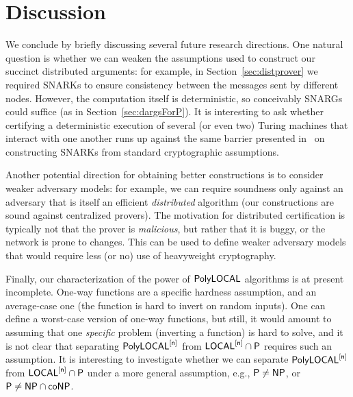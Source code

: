 \section{Discussion}
\label{sec:discuss}

We conclude by briefly discussing several future research directions.
One natural question is whether we can weaken the assumptions used to construct our
succinct distributed arguments: for example, in Section~\ref{sec:distprover}
we required SNARKs to ensure consistency between the messages sent by different nodes.
However, the computation itself is deterministic, so conceivably SNARGs could suffice
(as in Section~\ref{sec:dargsForP}).
It is interesting to ask whether certifying a deterministic execution of several (or even two)
Turing machines that interact with one another runs up against the same barrier presented in~\cite{gentry2011separating}
on constructing SNARKs from standard cryptographic assumptions.

Another potential direction for obtaining better constructions is to consider weaker adversary models:
for example, we can require soundness only against an adversary that is itself an efficient \emph{distributed}
algorithm (our constructions are sound against centralized provers).
The motivation for distributed certification is typically not that the prover is \emph{malicious},
but rather that it is buggy, or the network is prone to changes.
This can be used to define weaker adversary models that would require less (or no) use of heavyweight
cryptography.

Finally, our characterization of the power of ${\mathsf{PolyLOCAL}}$ algorithms
is at present incomplete.
One-way functions are a specific hardness assumption,
and an average-case one (the function is hard to invert on random inputs).
One can define a worst-case version of one-way functions,
but still, it would amount to assuming
that one \emph{specific} problem (inverting a function) is hard to solve,
and it is not clear that separating $\mathsf{PolyLOCAL}^{[\mathsf{n}]}$ from ${\mathsf{LOCAL}}^{[\mathsf{n}]} \cap {\mathsf{P}}$
requires such an assumption.
It is interesting to investigate whether 
we can separate $\mathsf{PolyLOCAL}^{[\mathsf{n}]}$ from ${\mathsf{LOCAL}}^{[\mathsf{n}]} \cap {\mathsf{P}}$
under a more general assumption, e.g., ${\mathsf{P}} \neq {\mathsf{NP}}$, or ${\mathsf{P}} \neq {\mathsf{NP}} \cap {\mathsf{coNP}}$.

